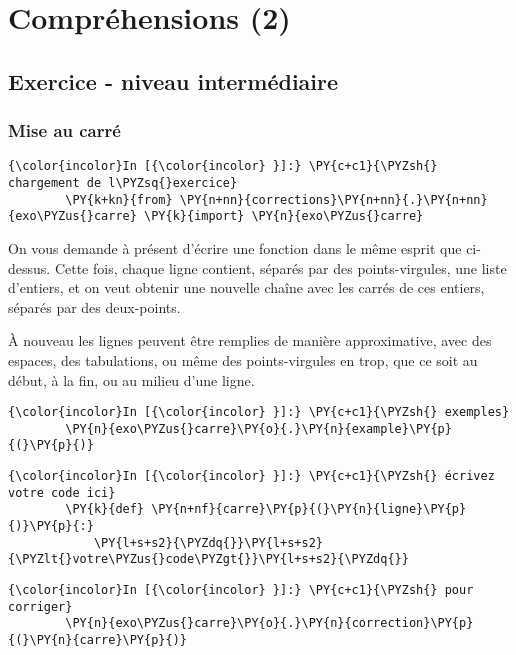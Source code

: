     \hypertarget{compruxe9hensions-2}{%
\section{Compréhensions (2)}\label{compruxe9hensions-2}}

    \hypertarget{exercice---niveau-intermuxe9diaire}{%
\subsection{Exercice - niveau
intermédiaire}\label{exercice---niveau-intermuxe9diaire}}

    \hypertarget{mise-au-carruxe9}{%
\subsubsection{Mise au carré}\label{mise-au-carruxe9}}

    \begin{Verbatim}[commandchars=\\\{\}]
{\color{incolor}In [{\color{incolor} }]:} \PY{c+c1}{\PYZsh{} chargement de l\PYZsq{}exercice}
        \PY{k+kn}{from} \PY{n+nn}{corrections}\PY{n+nn}{.}\PY{n+nn}{exo\PYZus{}carre} \PY{k}{import} \PY{n}{exo\PYZus{}carre}
\end{Verbatim}


    On vous demande à présent d'écrire une fonction dans le même esprit que
ci-dessus. Cette fois, chaque ligne contient, séparés par des
points-virgules, une liste d'entiers, et on veut obtenir une nouvelle
chaîne avec les carrés de ces entiers, séparés par des deux-points.

À nouveau les lignes peuvent être remplies de manière approximative,
avec des espaces, des tabulations, ou même des points-virgules en trop,
que ce soit au début, à la fin, ou au milieu d'une ligne.

    \begin{Verbatim}[commandchars=\\\{\}]
{\color{incolor}In [{\color{incolor} }]:} \PY{c+c1}{\PYZsh{} exemples}
        \PY{n}{exo\PYZus{}carre}\PY{o}{.}\PY{n}{example}\PY{p}{(}\PY{p}{)}
\end{Verbatim}


    \begin{Verbatim}[commandchars=\\\{\}]
{\color{incolor}In [{\color{incolor} }]:} \PY{c+c1}{\PYZsh{} écrivez votre code ici}
        \PY{k}{def} \PY{n+nf}{carre}\PY{p}{(}\PY{n}{ligne}\PY{p}{)}\PY{p}{:}
            \PY{l+s+s2}{\PYZdq{}}\PY{l+s+s2}{\PYZlt{}votre\PYZus{}code\PYZgt{}}\PY{l+s+s2}{\PYZdq{}}
\end{Verbatim}


    \begin{Verbatim}[commandchars=\\\{\}]
{\color{incolor}In [{\color{incolor} }]:} \PY{c+c1}{\PYZsh{} pour corriger}
        \PY{n}{exo\PYZus{}carre}\PY{o}{.}\PY{n}{correction}\PY{p}{(}\PY{n}{carre}\PY{p}{)}
\end{Verbatim}